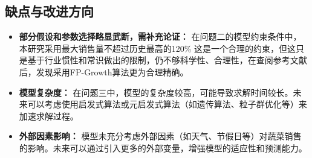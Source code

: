 \documentclass{article}
\begin{document}
\subsection{缺点与改进方向}
\begin{itemize}
    \item \textbf{部分假设和参数选择略显武断，需补充论证：} 在问题二的模型约束条件中，本研究采用最大销售量不超过历史最高的120\%  这是一个合理的约束，但这只是基于行业惯性和常识做出的限制，仍不够科学性、合理性，在查阅参考文献后，发现采用FP-Growth算法更为合理精确。

    \item \textbf{模型复杂度：} 在问题三中，模型的复杂度较高，可能导致求解时间较长。未来可以考虑使用启发式算法或元启发式算法（如遗传算法、粒子群优化等）来加速求解过程。

    \item \textbf{外部因素影响：} 模型未充分考虑外部因素（如天气、节假日等）对蔬菜销售的影响。未来可以通过引入更多的外部变量，增强模型的适应性和预测能力。
\end{itemize}
\end{document}
